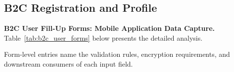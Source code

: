 \label{sec:b2c_mobile_web}
\label{tab:b2c_mobile_screens}

\iffalse %
\subsection{B2C Registration and Profile}
\label{sec:b2c_forms}


\iffalse %


\noindent\textbf{B2C User Fill-Up Forms: Mobile Application Data Capture.} Table~\ref{tab:b2c_user_forms} below presents the detailed analysis.

\noindent Form-level entries name the validation rules, encryption requirements, and downstream consumers of each input field.
